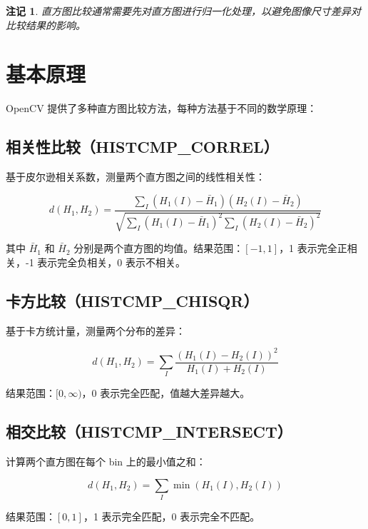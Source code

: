 \documentclass{article}
\newtheorem{remark}{注记}[section]
\begin{document}
\begin{remark}
直方图比较通常需要先对直方图进行归一化处理，以避免图像尺寸差异对比较结果的影响。
\end{remark}

\section{基本原理}

OpenCV 提供了多种直方图比较方法，每种方法基于不同的数学原理：

\subsection{相关性比较（HISTCMP\_CORREL）}

基于皮尔逊相关系数，测量两个直方图之间的线性相关性：

\begin{equation}
d(H_1,H_2) = \frac{\sum_I (H_1(I) - \bar{H}_1)(H_2(I) - \bar{H}_2)}{\sqrt{\sum_I (H_1(I) - \bar{H}_1)^2 \sum_I (H_2(I) - \bar{H}_2)^2}}
\end{equation}

其中 $\bar{H}_1$ 和 $\bar{H}_2$ 分别是两个直方图的均值。结果范围：$[-1, 1]$，1 表示完全正相关，-1 表示完全负相关，0 表示不相关。

\subsection{卡方比较（HISTCMP\_CHISQR）}

基于卡方统计量，测量两个分布的差异：

\begin{equation}
d(H_1,H_2) = \sum_I \frac{(H_1(I) - H_2(I))^2}{H_1(I) + H_2(I)}
\end{equation}

结果范围：$[0, \infty)$，0 表示完全匹配，值越大差异越大。

\subsection{相交比较（HISTCMP\_INTERSECT）}

计算两个直方图在每个 bin 上的最小值之和：

\begin{equation}
d(H_1,H_2) = \sum_I \min(H_1(I), H_2(I))
\end{equation}

结果范围：$[0, 1]$，1 表示完全匹配，0 表示完全不匹配。
\end{document}
